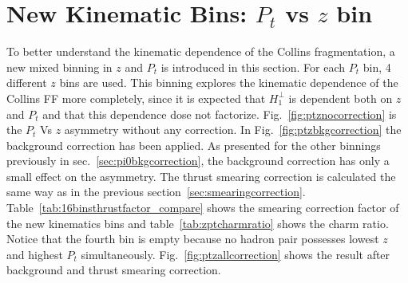 \section{\texorpdfstring{New Kinematic Bins: $P_t$ vs $z$ bin}{New kinematic Bins: pt Vs z bin}}
\label{sec:newbins}
To better understand the kinematic dependence of the Collins fragmentation, a new mixed binning in $z$ and $P_t$ is introduced in this section. For each $P_t$ bin, 4 different $z$ bins are used. This binning explores the kinematic dependence of the Collins FF more completely, since it is expected that $H_1^{\bot}$ is dependent both on $z$ and $P_t$ and that this dependence dose not factorize. Fig.~\ref{fig:ptznocorrection} is the $P_t$ Vs $z$ asymmetry without any correction. In Fig.~\ref{fig:ptzbkgcorrection} the background correction has been applied. As presented for the other binnings previously in sec.~\ref{sec:pi0bkgcorrection}, the background correction has only a small effect on the asymmetry. The thrust smearing correction is calculated the same way as in the previous section~\ref{sec:smearingcorrection}. Table~\ref{tab:16binsthrustfactor_compare} shows the smearing correction factor of the new kinematics bins and table~\ref{tab:zptcharmratio} shows the charm ratio. Notice that the fourth bin is empty because no hadron pair possesses lowest $z$ and highest $P_t$ simultaneously. Fig.~\ref{fig:ptzallcorrection} shows the result after background and thrust smearing correction. 
